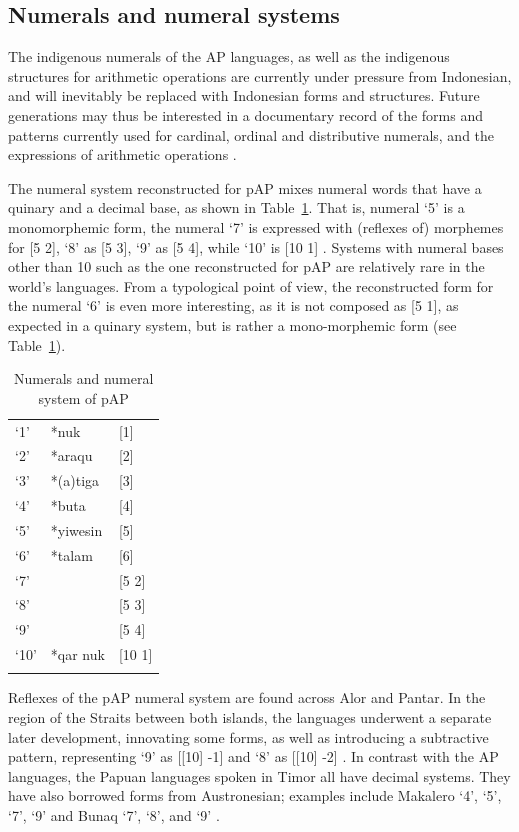 \subsection{Numerals and numeral systems}\label{sec:1:6.2}
The indigenous numerals of the AP languages, as well as the indigenous structures for arithmetic operations are currently under pressure from Indonesian, and will inevitably be replaced with Indonesian forms and structures. Future generations may thus be interested in a documentary record of the forms and patterns currently used for cardinal, ordinal and distributive numerals, and the expressions of arithmetic operations \citep{KlamerSchapperCorbettTVnumeralwords}.

The numeral system reconstructed for pAP mixes numeral words that have a quinary and a decimal base, as shown in Table~\ref{tab:1:11}. That is, numeral `5' is a monomorphemic form, the numeral `7' is expressed with (reflexes of) morphemes for [5 2], `8' as [5 3], `9' as [5 4], while `10' is [10 1] \citep{SchapperEtAlTVnumeralsystems}. Systems with numeral bases other than 10 such as the one reconstructed for pAP are relatively rare in the world's languages. From a typological point of view, the reconstructed form for the numeral `6' is even more interesting, as it is not composed as [5 1], as expected in a quinary system, but is rather a mono-morphemic form (see Table~\ref{tab:1:11}).


\begin{table}[h]
\caption{Numerals and numeral system of pAP \citep{SchapperEtAlTVnumeralsystems}}
\label{tab:1:11}
\begin{tabularx}{.5\textwidth}{XXX}      
\lsptoprule
`1' & *nuk  &  [1] \\
`2' & *araqu   &  [2] \\
`3' & *(a)tiga  &  [3] \\
`4' & *buta  &  [4] \\
`5' & *yiwesin  &  [5]  \\
`6' & *talam  &  [6] \\
`7' &  &  [5 2] \\
`8' &  &  [5 3] \\
`9' &  &  [5 4] \\
`10' & *qar nuk  & [10 1] \\
\lspbottomrule
\end{tabularx}
\end{table}

Reflexes of the pAP numeral system are found across Alor and Pantar.  In the region of the Straits between both islands, the languages underwent a separate later development, innovating some forms, as well as introducing a subtractive pattern, representing `9' as [[10] -1] and `8' as [[10] -2] \citep{SchapperEtAlTVnumeralsystems}. In contrast with the AP languages, the Papuan languages spoken in Timor all have decimal systems. They have also borrowed forms from Austronesian; examples include Makalero `4', `5', `7', `9' \citep{Huber2011} and Bunaq `7', `8', and `9' \citep{Schapper2009}. 

